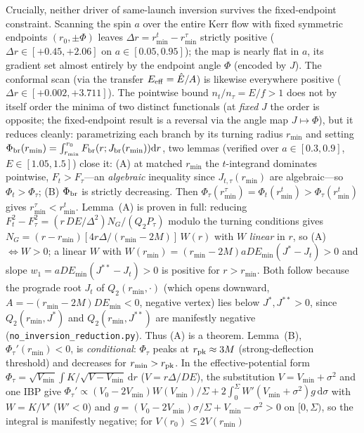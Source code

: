 \documentclass[
    aps, prd, twocolumn, superscriptaddress,
    showpacs, nofootinbib, floatfix
]{revtex4-2}
\newcommand{\dd}{\mathrm{d}}
\begin{document}
Crucially, neither driver of same-launch inversion survives the
fixed-endpoint constraint. Scanning the spin $a$ over the entire
Kerr flow with fixed symmetric endpoints $(r_0,\pm\Phi)$ leaves
$\Delta r=r_{\min}^t-r_{\min}^\tau$ strictly positive
($\Delta r\in[+0.45,+2.06]$ on $a\in[0.05,0.95]$); the map is nearly flat
in $a$, its gradient set almost entirely by the endpoint angle
$\Phi$ (encoded by $J$). The conformal scan (via the transfer
$E_{\rm eff}=\hat E/A$) is likewise everywhere positive
($\Delta r\in[+0.002,+3.711]$). The pointwise bound $n_t/n_\tau=E/f>1$ does not by
itself order the minima of two distinct functionals (at \emph{fixed} $J$ the order is
opposite; the fixed-endpoint result is a reversal via the angle map $J\mapsto\Phi$),
but it reduces cleanly: parametrizing each branch by its turning radius $r_{\min}$ and
setting $\Phi_{\rm br}(r_{\min})=\int_{r_{\min}}^{r_0}F_{\rm br}(r;J_{\rm
br}(r_{\min}))\dd r$, two lemmas (verified over $a\in[0.3,0.9]$, $E\in[1.05,1.5]$)
close it: (A) at matched $r_{\min}$ the $t$-integrand dominates pointwise,
$F_t>F_\tau$---an \emph{algebraic} inequality since $J_{t,\tau}(r_{\min})$ are
algebraic---so $\Phi_t>\Phi_\tau$; (B) $\Phi_{\rm br}$ is strictly decreasing. Then
$\Phi_\tau(r_{\min}^\tau)=\Phi_t(r_{\min}^t)>\Phi_\tau(r_{\min}^t)$ gives
$r_{\min}^\tau<r_{\min}^t$. Lemma~(A) is proven in full: reducing
$F_t^2-F_\tau^2=(r\,DE/\Delta^2)N_G/(Q_2P_\tau)$ modulo the turning conditions gives
$N_G=(r-r_{\min})[4r\Delta/(r_{\min}-2M)]\,W(r)$ with $W$ \emph{linear} in $r$, so
(A) $\Leftrightarrow W>0$; a linear $W$ with $W(r_{\min})=(r_{\min}-2M)aDE_{\min}(J^\ast-J_t)>0$
and slope $w_1=aDE_{\min}(J^{\ast\ast}-J_t)>0$ is positive for $r>r_{\min}$. Both
follow because the prograde root $J_t$ of $Q_2(r_{\min},\cdot)$ (which opens downward,
$A=-(r_{\min}-2M)DE_{\min}<0$, negative vertex) lies below $J^\ast,J^{\ast\ast}>0$,
since $Q_2(r_{\min},J^\ast)$ and $Q_2(r_{\min},J^{\ast\ast})$ are manifestly negative
(\texttt{no\_inversion\_reduction.py}). Thus (A) is a theorem. Lemma~(B),
$\Phi_\tau'(r_{\min})<0$, is \emph{conditional}: $\Phi_\tau$ peaks at
$r_{\rm pk}\approx3M$ (strong-deflection threshold) and decreases for
$r_{\min}>r_{\rm pk}$. In the effective-potential form
$\Phi_\tau=\sqrt{V_{\min}}\int K/\sqrt{V-V_{\min}}\,\dd r$ ($V=r\Delta/DE$), the
substitution $V=V_{\min}+\sigma^2$ and one IBP give
$\Phi_\tau'\propto(V_0-2V_{\min})W(V_{\min})/\Sigma+2\int_0^\Sigma W'(V_{\min}+\sigma^2)g\,\dd\sigma$
with $W=K/V'$ ($W'<0$) and $g=(V_0-2V_{\min})\sigma/\Sigma+V_{\min}-\sigma^2>0$ on
$[0,\Sigma)$, so the integral is manifestly negative; for $V(r_0)\le2V(r_{\min})$
\end{document}
